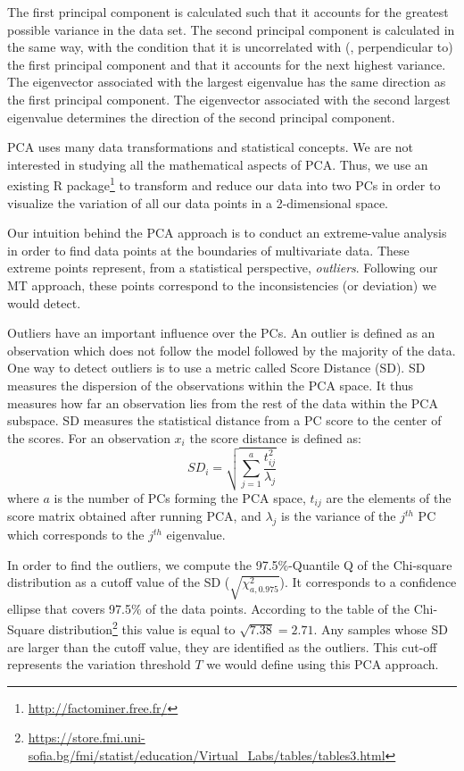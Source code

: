 The first principal component is calculated such that it accounts for the greatest possible variance in the data set. The second principal component is calculated in the same way, with the condition that it is uncorrelated with (\ie, perpendicular to) the first principal component and that it accounts for the next highest variance. The eigenvector associated with the largest eigenvalue has the same direction as the first principal component. The eigenvector associated with the second largest eigenvalue determines the direction of the second principal component.

PCA uses many data transformations and statistical concepts. We are not interested in studying all the mathematical aspects of PCA. Thus, we use an existing R package\footnote{\url{http://factominer.free.fr/}} to transform and reduce our data into two PCs in order to visualize the variation of all our data points in a 2-dimensional space.

Our intuition behind the PCA approach is to conduct an extreme-value analysis in order to find data points at the boundaries of multivariate data. These extreme points represent, from a statistical perspective, \textit{outliers}. Following our MT approach, these points correspond to the inconsistencies (or deviation) we would detect. 

Outliers have an important influence over the PCs. An outlier is defined as an observation which does not follow the model followed by the majority of the data.
One way to detect outliers is to use a metric called Score Distance (SD). SD measures the dispersion of the observations within the PCA space. It thus measures how far an observation lies from the rest of the data within the PCA subspace. 
SD measures the statistical distance from a PC score to the center of the scores. For an observation $x_{i}$ the  score distance is defined as:
\begin{equation}
SD_{i}=\sqrt{\sum_{j=1}^{a} \frac{t_{ij}^{2}}{\lambda_{j}}}
\end{equation}
where $a$ is the number of PCs forming the PCA space, $t_{ij}$ are the elements of the score matrix obtained after running PCA, and $\lambda_{j}$ is the variance of the $j^{th}$ PC which corresponds to the $j^{th}$ eigenvalue.

In order to find the outliers, we compute the 97.5\%-Quantile Q of the Chi-square distribution as a cutoff value of the SD ($\sqrt{\chi_{a,0.975}^{2} }$). It corresponds to a confidence ellipse that covers 97.5\% of the data points. According to the table of the Chi-Square distribution\footnote{\url{https://store.fmi.uni-sofia.bg/fmi/statist/education/Virtual_Labs/tables/tables3.html}} this value is equal to $\sqrt{7.38}=2.71$.
Any samples whose SD are larger than the cutoff value, they are identified as the outliers. This cut-off represents the variation threshold $T$ we would define using this PCA approach.

